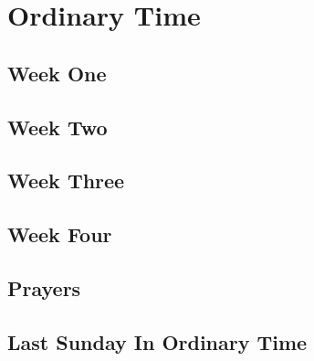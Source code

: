 \documentclass[extrafontsizes,9pt,twoside]{memoir}
\begin{document}
\chapter*[Ordinary Time]{Ordinary Time}
\clearpage

\section*{Week One}

\section*{Week Two}

\section*{Week Three}

\section*{Week Four}

\section*{Prayers}
\section*{Last Sunday In Ordinary Time}

\end{document}

